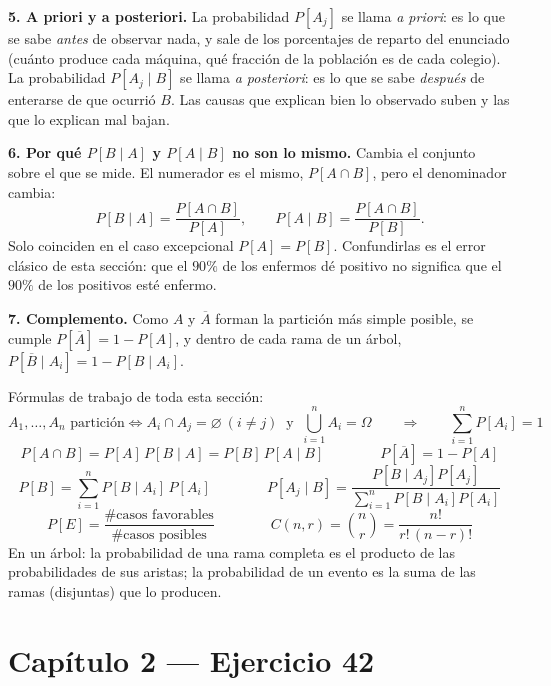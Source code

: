 \documentclass[11pt]{article}
\begin{document}
\begin{teo}
\medskip
\textbf{5. A priori y a posteriori.} La probabilidad $P[A_j]$ se llama \emph{a priori}: es lo que se sabe \emph{antes} de observar nada, y sale de los porcentajes de reparto del enunciado (cu\'anto produce cada m\'aquina, qu\'e fracci\'on de la poblaci\'on es de cada colegio). La probabilidad $P[A_j\mid B]$ se llama \emph{a posteriori}: es lo que se sabe \emph{despu\'es} de enterarse de que ocurri\'o $B$. Las causas que explican bien lo observado suben y las que lo explican mal bajan.

\medskip
\textbf{6. Por qu\'e $P[B\mid A]$ y $P[A\mid B]$ no son lo mismo.} Cambia el conjunto sobre el que se mide. El numerador es el mismo, $P[A\cap B]$, pero el denominador cambia:
\[
P[B\mid A]=\frac{P[A\cap B]}{P[A]},\qquad P[A\mid B]=\frac{P[A\cap B]}{P[B]} .
\]
Solo coinciden en el caso excepcional $P[A]=P[B]$. Confundirlas es el error cl\'asico de esta secci\'on: que el $90\%$ de los enfermos d\'e positivo no significa que el $90\%$ de los positivos est\'e enfermo.

\medskip
\textbf{7. Complemento.} Como $A$ y $\overline{A}$ forman la partici\'on m\'as simple posible, se cumple $P[\overline{A}]=1-P[A]$, y dentro de cada rama de un \'arbol, $P[\overline{B}\mid A_i]=1-P[B\mid A_i]$.
\end{teo}

\begin{tip}
F\'ormulas de trabajo de toda esta secci\'on:
\[
A_1,\dots,A_n \text{ partici\'on}\iff A_i\cap A_j=\varnothing\ (i\neq j)\ \text{ y }\ \bigcup_{i=1}^{n}A_i=\Omega
\qquad\Longrightarrow\qquad \sum_{i=1}^{n}P[A_i]=1
\]
\[
P[A\cap B]=P[A]\,P[B\mid A]=P[B]\,P[A\mid B]
\qquad\qquad
P[\overline{A}]=1-P[A]
\]
\[
P[B]=\sum_{i=1}^{n}P[B\mid A_i]\,P[A_i]
\qquad\qquad
P[A_j\mid B]=\frac{P[B\mid A_j]P[A_j]}{\sum_{i=1}^{n}P[B\mid A_i]P[A_i]}
\]
\[
P[E]=\frac{\#\text{casos favorables}}{\#\text{casos posibles}}
\qquad\qquad
C(n,r)=\binom{n}{r}=\frac{n!}{r!\,(n-r)!}
\]
En un \'arbol: la probabilidad de una rama completa es el producto de las probabilidades de sus aristas; la probabilidad de un evento es la suma de las ramas (disjuntas) que lo producen.
\end{tip}

\section*{Cap\'itulo 2 --- Ejercicio 42}
\end{document}
